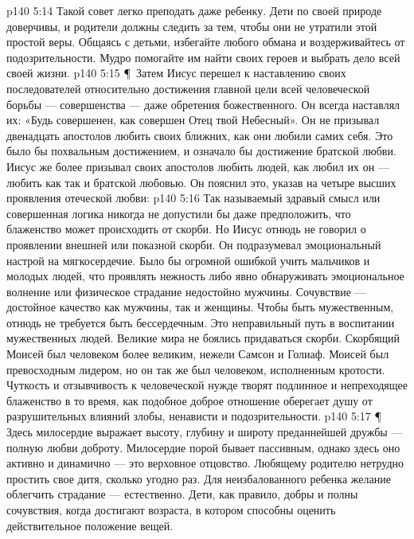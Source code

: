 \vs p140 5:14 Такой совет легко преподать даже ребенку. Дети по своей природе доверчивы, и родители должны следить за тем, чтобы они не утратили этой простой веры. Общаясь с детьми, избегайте любого обмана и воздерживайтесь от подозрительности. Мудро помогайте им найти своих героев и выбрать дело всей своей жизни.
\vs p140 5:15 \P\ Затем Иисус перешел к наставлению своих последователей относительно достижения главной цели всей человеческой борьбы --- совершенства --- даже обретения божественного. Он всегда наставлял их: «Будь совершенен, как совершен Отец твой Небесный». Он не призывал двенадцать апостолов любить своих ближних, как они любили самих себя. Это было бы похвальным достижением, и означало бы достижение братской любви. Иисус же более призывал своих апостолов любить людей, как любил их он --- любить как  так и братской любовью. Он пояснил это, указав на четыре высших проявления отеческой любви:
\vs p140 5:16 \bibnobreakspace {} Так называемый здравый смысл или совершенная логика никогда не допустили бы даже предположить, что блаженство может происходить от скорби. Но Иисус отнюдь не говорил о проявлении внешней или показной скорби. Он подразумевал эмоциональный настрой на мягкосердечие. Было бы огромной ошибкой учить мальчиков и молодых людей, что проявлять нежность либо явно обнаруживать эмоциональное волнение или физическое страдание недостойно мужчины. Сочувствие --- достойное качество как мужчины, так и женщины. Чтобы быть мужественным, отнюдь не требуется быть бессердечным. Это неправильный путь в воспитании мужественных людей. Великие мира не боялись придаваться скорби. Скорбящий Моисей был человеком более великим, нежели Самсон и Голиаф. Моисей был превосходным лидером, но он так же был человеком, исполненным кротости. Чуткость и отзывчивость к человеческой нужде творят подлинное и непреходящее блаженство в то время, как подобное доброе отношение оберегает душу от разрушительных влияний злобы, ненависти и подозрительности.
\vs p140 5:17 \P\ \bibnobreakspace {} Здесь милосердие выражает высоту, глубину и широту преданнейшей дружбы --- полную любви доброту. Милосердие порой бывает пассивным, однако здесь оно активно и динамично --- это верховное отцовство. Любящему родителю нетрудно простить свое дитя, сколько угодно раз. Для неизбалованного ребенка желание облегчить страдание --- естественно. Дети, как правило, добры и полны сочувствия, когда достигают возраста, в котором способны оценить действительное положение вещей.
